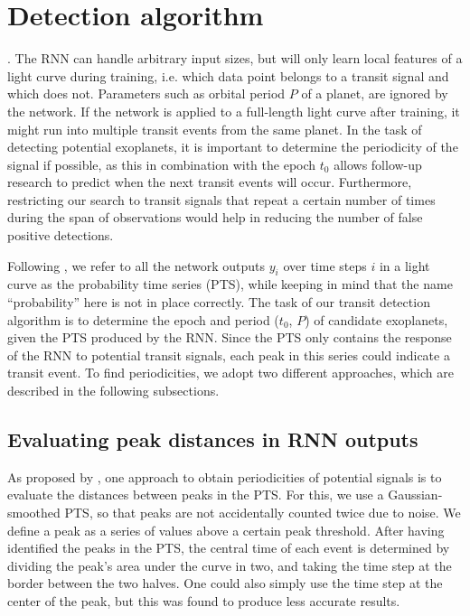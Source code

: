 
\section{Detection algorithm}
\label{sec:algorithms}

. The RNN can handle arbitrary input sizes, but will only learn local features of a light curve during training, i.e. which data point belongs to a transit signal and which does not. Parameters such as orbital period $P$ of a planet, are ignored by the network. If the network is applied to a full-length light curve after training, it might run into multiple transit events from the same planet. In the task of detecting potential exoplanets, it is important to determine the periodicity of the signal if possible, as this in combination with the epoch $t_0$ allows follow-up research to predict when the next transit events will occur. Furthermore, restricting our search to transit signals that repeat a certain number of times during the span of observations would help in reducing the number of false positive detections.

Following \cite{pearson2018searching}, we refer to all the network outputs $y_i$ over time steps $i$ in a light curve as the probability time series (PTS), while keeping in mind that the name ``probability'' here is not in place correctly. The task of our transit detection algorithm is to determine the epoch and period ($t_0$, $P$) of candidate exoplanets, given the PTS produced by the RNN. Since the PTS only contains the response of the RNN to potential transit signals, each peak in this series could indicate a transit event. To find periodicities, we adopt two different approaches, which are described in the following subsections. 

\subsection{Evaluating peak distances in RNN outputs}
\label{sec:alg_peaks}
As proposed by \cite{pearson2018searching}, one approach to obtain periodicities of potential signals is to evaluate the distances between peaks in the PTS. For this, we use a Gaussian-smoothed PTS, so that peaks are not accidentally counted twice due to noise. We define a peak as a series of values above a certain peak threshold. After having identified the peaks in the PTS, the central time of each event is determined by dividing the peak's area under the curve in two, and taking the time step at the border between the two halves. One could also simply use the time step at the center of the peak, but this was found to produce less accurate results. 

